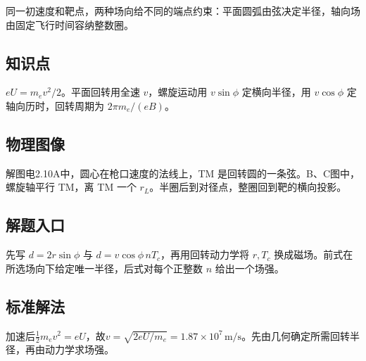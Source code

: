 \documentclass[UTF8,fontset=fandol,a4paper,11pt]{ctexart}
\begin{document}
同一初速度和靶点，两种场向给不同的端点约束：平面圆弧由弦决定半径，轴向场由固定飞行时间容纳整数圈。



\subsection*{知识点}

$eU=m_ev^2/2$。平面回转用全速 $v$，螺旋运动用 $v\sin\phi$ 定横向半径，用 $v\cos\phi$ 定轴向历时，回转周期为 $2\pi m_e/(eB)$。



\subsection*{物理图像}

解图电2.10A中，圆心在枪口速度的法线上，TM 是回转圆的一条弦。B、C图中，螺旋轴平行 TM，离 TM 一个 $r_L$。半圈后到对径点，整圈回到靶的横向投影。



\subsection*{解题入口}

先写 $d=2r\sin\phi$ 与 $d=v\cos\phi\,nT_c$，再用回转动力学将 $r,T_c$ 换成磁场。前式在所选场向下给定唯一半径，后式对每个正整数 $n$ 给出一个场强。


\subsection*{标准解法}

加速后$\tfrac12m_ev^2=eU$，故$v=\sqrt{2eU/m_e}=1.87\times10^7\,\mathrm{m/s}$。先由几何确定所需回转半径，再由动力学求场强。
\end{document}
